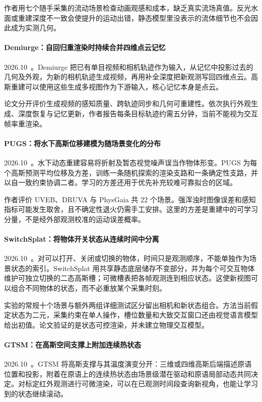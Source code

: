 作者用七个随手采集的流动场景检查动画观感和成本，缺乏真实流场真值。反光水面或重建深度不一致会使提升的运动出错，静态模型里没表示的流体细节也不会因此成为实测几何。

\paragraph{Demiurge：自回归重渲染时持续合并四维点云记忆}
2026.10~\cite{2610_14685}。Demiurge 把已有单目视频和相机轨迹作为输入，从记忆中投影过去的几何及外观，为新的相机轨迹生成视频，再用补全深度把新观测写回四维点云。高斯重建可以使用这些生成多视图作为下游输入，核心记忆本身是点云。

论文分开评价生成视频的感知质量、跨轨迹同步和几何可重建性。依次执行外观生成、深度恢复与记忆更新，作者报告每条目标轨迹约需五分钟，当前不能视为交互帧率重渲染。

\paragraph{PUGS：将水下高斯位移建模为随场景变化的分布}
2026.10~\cite{2610_17936}。水下动态重建容易将折射及暂态视觉噪声误当作物体形变。PUGS 为每个高斯预测平均位移及方差，训练一条随机探索的渲染支路和一条确定性支路，并以自一致约束协调二者。学习的方差还用于优先补充较难可靠拟合的区域。

作者评价 UVEB、DRUVA 与 PhysGaia 共 22 个场景。强浑浊时图像误差和感知指标可能发生取舍，且不确定性退火仍需手工安排。这里的方差是重建中的可学习分量，不是经外部观测校准的运动误差概率。

\paragraph{SwitchSplat：将物体开关状态从连续时间中分离}
2026.10~\cite{2610_24812}。对可以打开、关闭或切换的物体，时间只是观测顺序，不能单独作为场景状态的索引。SwitchSplat 用共享静态底层储存不变部分，并为每个可交互物体维护可独立切换的二态高斯槽；可微槽表把各帧观测连到相应状态。这使新视图可以组合不同物体的状态，而不必重放某个采集时刻。

实验的常规十个场景与额外两组详细测试区分留出相机和新状态组合。方法当前假定状态为二元，采集约束在单人操作，槽位数量和大致交互窗口还由视觉语言模型给出初值。论文验证的是状态可控渲染，并未建立物理交互模型。

\paragraph{GTSM：在高斯空间支撑上附加连续热状态}
2026.10~\cite{2610_26918}。GTSM 将高斯支撑与其温度演变分开：三维或四维高斯后端描述原语位置和投影，附着在原语上的连续热状态由场景级潜在驱动和原语局部动态共同决定。对标定红外观测进行可微渲染，可以在已观测时间段查询新视角，也能让学习到的状态继续滚动。

